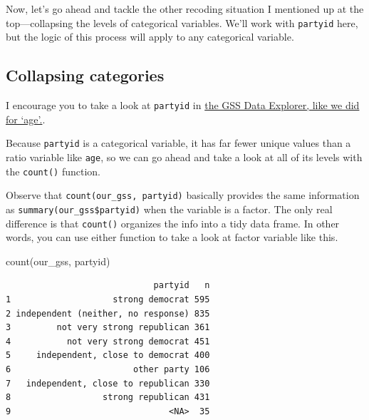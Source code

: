 \documentclass[
  letterpaper,
  DIV=11,
  numbers=noendperiod]{scrreprt}
\newenvironment{Shaded}{\begin{snugshade}}{\end{snugshade}}
\newcommand{\FunctionTok}[1]{\textcolor[rgb]{0.28,0.35,0.67}{#1}}
\newcommand{\NormalTok}[1]{\textcolor[rgb]{0.00,0.23,0.31}{#1}}
\begin{document}
Now, let's go ahead and tackle the other recoding situation I mentioned
up at the top---collapsing the levels of categorical variables. We'll
work with \texttt{partyid} here, but the logic of this process will
apply to any categorical variable.

\subsection{Collapsing categories}\label{collapsing-categories}

I encourage you to take a look at \texttt{partyid} in
\href{https://gssdataexplorer.norc.org/variables/141/vshow}{the GSS Data
Explorer, like we did for `age'.}.

Because \texttt{partyid} is a categorical variable, it has far fewer
unique values than a ratio variable like \texttt{age}, so we can go
ahead and take a look at all of its levels with the \texttt{count()}
function.

\begin{tcolorbox}[enhanced jigsaw, colframe=quarto-callout-note-color-frame, arc=.35mm, coltitle=black, breakable, rightrule=.15mm, left=2mm, opacitybacktitle=0.6, colbacktitle=quarto-callout-note-color!10!white, toptitle=1mm, bottomtitle=1mm, titlerule=0mm, leftrule=.75mm, colback=white, title=\textcolor{quarto-callout-note-color}{\faInfo}\hspace{0.5em}{Note}, opacityback=0, bottomrule=.15mm, toprule=.15mm]

Observe that \texttt{count(our\_gss,\ partyid)} basically provides the
same information as \texttt{summary(our\_gss\$partyid)} when the
variable is a factor. The only real difference is that \texttt{count()}
organizes the info into a tidy data frame. In other words, you can use
either function to take a look at factor variable like this.

\end{tcolorbox}

\begin{Shaded}
\begin{Highlighting}[]
\FunctionTok{count}\NormalTok{(our\_gss, partyid)}
\end{Highlighting}
\end{Shaded}

\begin{verbatim}
                             partyid   n
1                    strong democrat 595
2 independent (neither, no response) 835
3         not very strong republican 361
4           not very strong democrat 451
5     independent, close to democrat 400
6                        other party 106
7   independent, close to republican 330
8                  strong republican 431
9                               <NA>  35
\end{verbatim}
\end{document}
